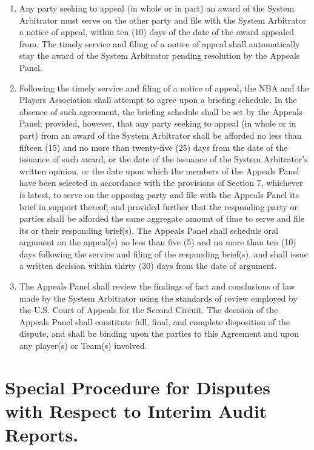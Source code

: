\documentclass[
]{book}
\providecommand{\tightlist}{%
  \setlength{\itemsep}{0pt}\setlength{\parskip}{0pt}}
\begin{document}
\begin{enumerate}
\def\labelenumi{(\alph{enumi})}
\tightlist
\item
  Any party seeking to appeal (in whole or in part) an award of the System Arbitrator must serve on the other party and file with the System Arbitrator a notice of appeal, within ten (10) days of the date of the award appealed from. The timely service and filing of a notice of appeal shall automatically stay the award of the System Arbitrator pending resolution by the Appeals Panel.
\item
  Following the timely service and filing of a notice of appeal, the NBA and the Players Association shall attempt to agree upon a briefing schedule. In the absence of such agreement, the briefing schedule shall be set by the Appeals Panel; provided, however, that any party seeking to appeal (in whole or in part) from an award of the System Arbitrator shall be afforded no less than fifteen (15) and no more than twenty-five (25) days from the date of the issuance of such award, or the date of the issuance of the System Arbitrator's written opinion, or the date upon which the members of the Appeals Panel have been selected in accordance with the provisions of Section 7, whichever is latest, to serve on the opposing party and file with the Appeals Panel its brief in support thereof; and provided further that the responding party or parties shall be afforded the same aggregate amount of time to serve and file its or their responding brief(s). The Appeals Panel shall schedule oral argument on the appeal(s) no less than five (5) and no more than ten (10) days following the service and filing of the responding brief(s), and shall issue a written decision within thirty (30) days from the date of argument.
\item
  The Appeals Panel shall review the findings of fact and conclusions of law made by the System Arbitrator using the standards of review employed by the U.S. Court of Appeals for the Second Circuit. The decision of the Appeals Panel shall constitute full, final, and complete disposition of the dispute, and shall be binding upon the parties to this Agreement and upon any player(s) or Team(s) involved.
\end{enumerate}

\hypertarget{special-procedure-for-disputes-with-respect-to-interim-audit-reports.}{%
\section{Special Procedure for Disputes with Respect to Interim Audit Reports.}\label{special-procedure-for-disputes-with-respect-to-interim-audit-reports.}}
\end{document}
